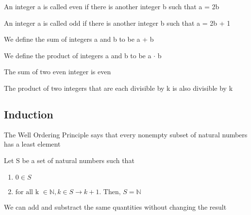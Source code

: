 \documentclass{article}
\begin{document}
\begin{definition}[Even]
    An integer a is called even if there is another integer b such that a = 2b
\end{definition}

\begin{definition}[Odd]
    An integer a is called odd if there is another integer b such that a = 2b + 1
\end{definition}

\begin{definition}[Sum]
    We define the sum of integers a and b to be a + b
\end{definition}

\begin{definition}[Product]
    We define the product of integers a and b to be a $ \cdot $ b
\end{definition}

\begin{theorem}
    The sum of two even integer is even
\end{theorem}

\begin{theorem}
    The product of two integers that are each divisible by k is also divisible by k
\end{theorem}

\subsection{Induction}

\begin{definition}
    The Well Ordering Principle says that every nonempty subset of natural numbers
    has a least element
\end{definition}

\begin{theorem}
    Let S be a set of natural numbers such that
    \begin{enumerate}
	\item $ 0 \in S $
	\item $ \text{for all k } \in \mathbb{N} , k \in S \rightarrow k+1.
	    \text{ Then, } S= \mathbb{N} $
    \end{enumerate}
\end{theorem}

\begin{lemma}
    We can add and substract the same quantities without changing the result
\end{lemma}
\end{document}
